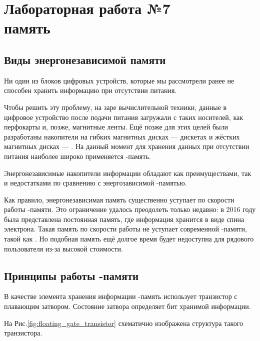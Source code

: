 \chapter{Лабораторная работа №7\\ память} 

\section{Виды энергонезависимой памяти}

\par{Ни один из блоков цифровых устройств, которые мы рассмотрели ранее не способен хранить информацию при отсутствии питания.}

\par{Чтобы решить эту проблему, на заре вычислительной техники, данные в цифровое устройство после подачи питания загружали с таких носителей, как перфокарты и, позже, магнитные ленты. Ещё позже для этих целей были разработаны накопители на гибких магнитных дисках --- дискетах и жёстких магнитных дисках --- . На данный момент для хранения данных при отсутствии питания наиболее широко применяется -память.}

\par{Энергонезависимые накопители информации обладают как преимуществами, так и недостатками по сравнению с энергозависимой -памятью.} 

\par{Как правило, энергонезависимая память существенно уступает по скорости работы -памяти. Это ограничение удалось преодолеть только недавно: в 2016 году была представлена постоянная память, где информация хранится в виде спина электрона. Такая память по скорости работы не уступает современной -памяти, такой как . Но подобная память ещё долгое время будет  недоступна для рядового пользователя из-за высокой стоимости.}

\section{Принципы работы -памяти}

\par{В качестве элемента хранения информации -память использует транзистор с плавающим затвором. Состояние затвора определяет бит хранимой информации.}
\par{На Рис.\ref{fig:floating_gate_transistor} схематично изображена структура такого транзистора.}

